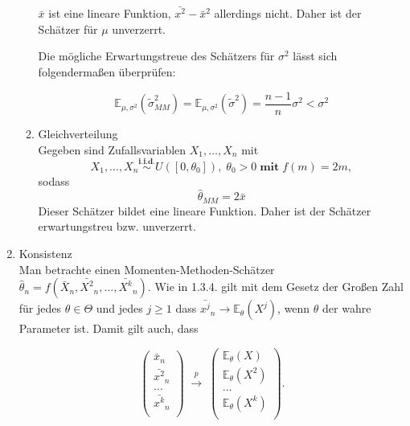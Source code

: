 \documentclass[10pt]{article}
\newcommand{\FZV}{X_1, \ldots, X_n} %
\newcommand{\EW}{\mathbb{E}} %
\begin{document}
\begin{enumerate}
\begin{enumerate}[label = (\roman*)]
		$\bar{x}$ ist eine lineare Funktion, $\bar{x^2}-\bar{x}^2$ allerdings nicht.  Daher ist der Schätzer für $\mu$ unverzerrt. 
		
		Die mögliche Erwartungstreue des Schätzers für $\sigma^2$ lässt sich folgendermaßen überprüfen:
		
		\begin{equation*}
			\EW_{\mu,\sigma^2} (\tilde{\sigma}^2_{MM}) = \EW_{\mu,\sigma^2} (\tilde{\sigma}^2) = \frac{n - 1 }{n} \sigma^2 < \sigma^2 
		\end{equation*}
	
			\item Gleichverteilung\\
		Gegeben sind Zufallsvariablen $\FZV$ mit
		\begin{equation*}
			\FZV \overset{\textbf{i.i.d.}}{\sim} U([0,\theta_0]), \; \theta_0 >0 \;\textbf{mit}\; f(m) = 2m,
		\end{equation*}
		sodass
		\begin{equation*}
			\hat{\theta}_{MM} = 2\bar{x}
		\end{equation*}
		Dieser Schätzer bildet eine lineare Funktion. Daher ist der Schätzer erwartungstreu bzw. unverzerrt. 
	\end{enumerate}	
	
	\item Konsistenz \\
	Man betrachte einen Momenten-Methoden-Schätzer $\hat{\theta}_n = f(\bar{X}_n, \bar{X^2}_n, \ldots, \bar{X^k}_n)$. Wie in 1.3.4. gilt mit dem Gesetz der Großen Zahl für jedes $\theta \in \Theta$ und jedes $j \geq 1$ dass $\bar{x^j}_n \longrightarrow \EW_\theta (X^j)$, wenn $\theta$ der wahre Parameter ist. Damit gilt auch, dass
	
		\begin{equation*}
		\left(
		\begin{array}{c}
			\bar{x}_n\\
			\bar{x^2}_n\\
			\dots\\
			\bar{x^k}_n\\
		\end{array}
		\right)\; \overset{p}\longrightarrow \;
		\left(
		\begin{array}{c}
			\EW_\theta(X)\\
			\EW_\theta(X^2)\\
			\dots\\
			\EW_\theta(X^k) \\
		\end{array}
		\right).
	\end{equation*}


\end{enumerate}
\end{document}
